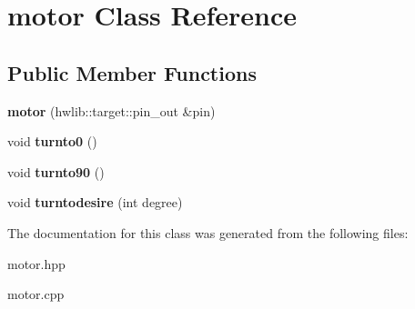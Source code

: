 \hypertarget{classmotor}{}\section{motor Class Reference}
\label{classmotor}
\subsection*{Public Member Functions}
\begin{DoxyCompactItemize}
\item 
{\bfseries motor} (hwlib\+::target\+::pin\+\_\+out \&pin)\hypertarget{classmotor_a3973f713a75b2a7a54df0bc5167e0d6f}{}\label{classmotor_a3973f713a75b2a7a54df0bc5167e0d6f}

\item 
void {\bfseries turnto0} ()\hypertarget{classmotor_a942b9474ad3226a035908333d5d09a86}{}\label{classmotor_a942b9474ad3226a035908333d5d09a86}

\item 
void {\bfseries turnto90} ()\hypertarget{classmotor_a8983111ce2a6fb60d1ef4d26028981c8}{}\label{classmotor_a8983111ce2a6fb60d1ef4d26028981c8}

\item 
void {\bfseries turntodesire} (int degree)\hypertarget{classmotor_ac7232afd76ac9801db9f6063bbeea77b}{}\label{classmotor_ac7232afd76ac9801db9f6063bbeea77b}

\end{DoxyCompactItemize}


The documentation for this class was generated from the following files\+:\begin{DoxyCompactItemize}
\item 
motor.\+hpp\item 
motor.\+cpp\end{DoxyCompactItemize}

